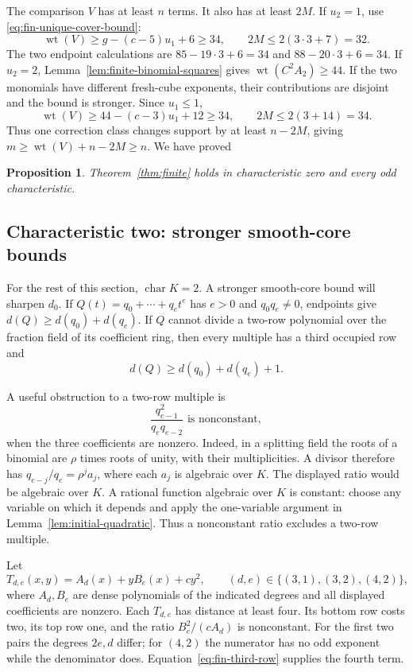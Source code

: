 \documentclass[11pt]{article}
\DeclareMathOperator{\wt}{wt}\DeclareMathOperator{\ord}{ord}
\numberwithin{equation}{section}
\newtheorem{proposition}[theorem]{Proposition}
\theoremstyle{definition}\newtheorem{definition}[theorem]{Definition}
\theoremstyle{remark}\newtheorem{remark}[theorem]{Remark}
\begin{document}
The comparison $V$ has at least $n$ terms. It also has at
least $2M$. If $u_2=1$, use \eqref{eq:fin-unique-cover-bound}:
\[
 \wt(V)\ge g-(c-5)u_1+6\ge34,
 \qquad 2M\le2(3\cdot3+7)=32.
\]
The two endpoint calculations are
$85-19\cdot3+6=34$ and $88-20\cdot3+6=34$.
If $u_2=2$, Lemma~\ref{lem:finite-binomial-squares} gives
$\wt(C^2A_2)\ge44$. If the two monomials have different
fresh-cube exponents, their contributions are disjoint and
the bound is stronger. Since $u_1\le1$,
\[
 \wt(V)\ge44-(c-3)u_1+12\ge34,
 \qquad 2M\le2(3+14)=34.
\]
Thus one correction class changes support by at least $n-2M$,
giving $m\ge\wt(V)+n-2M\ge n$. We have proved
\begin{proposition}\label{prop:fin-odd}
Theorem~\ref{thm:finite} holds in characteristic zero and every odd
characteristic.
\end{proposition}

\subsection{Characteristic two: stronger smooth-core bounds}

For the rest of this section, $\operatorname{char}K=2$.
A stronger smooth-core bound will sharpen $d_0$.
If $Q(t)=q_0+\cdots+q_et^e$ has $e>0$ and $q_0q_e\ne0$, endpoints give
$d(Q)\ge d(q_0)+d(q_e)$. If $Q$ cannot divide a two-row polynomial
over the fraction field of its coefficient ring, then every multiple
has a third occupied row and
\begin{equation}\label{eq:fin-third-row}
 d(Q)\ge d(q_0)+d(q_e)+1.
\end{equation}

A useful obstruction to a two-row multiple is
\begin{equation}\label{eq:fin-binomial-invariant}
 \frac{q_{e-1}^2}{q_eq_{e-2}}\text{ is nonconstant},
\end{equation}
when the three coefficients are nonzero. Indeed, in a splitting field
the roots of a binomial are $\rho$ times roots of unity, with their
multiplicities. A divisor therefore has
$q_{e-j}/q_e=\rho^j a_j$, where each $a_j$ is algebraic over $K$.
The displayed ratio would be algebraic over $K$. A rational function
algebraic over $K$ is constant: choose any variable on which it depends
and apply the one-variable argument in Lemma~\ref{lem:initial-quadratic}.
Thus a nonconstant ratio excludes a two-row multiple.

Let
\[
 T_{d,e}(x,y)=A_d(x)+yB_e(x)+c y^2,
 \qquad (d,e)\in\{(3,1),(3,2),(4,2)\},
\]
where $A_d,B_e$ are dense polynomials of the indicated degrees and
all displayed coefficients are nonzero. Each $T_{d,e}$ has distance
at least four. Its bottom row costs two, its top row one, and the
ratio $B_e^2/(cA_d)$ is nonconstant. For the first two pairs the degrees
$2e,d$ differ; for $(4,2)$ the numerator has no odd exponent while the
denominator does. Equation~\eqref{eq:fin-third-row} supplies the
fourth term.
\end{document}
